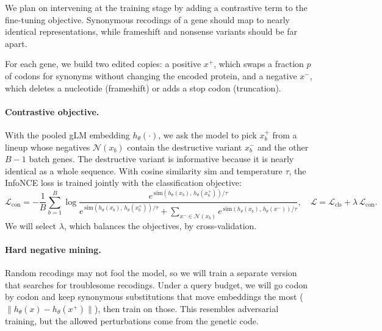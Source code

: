 \documentclass{article}
\begin{document}
We plan on intervening at the training stage by adding a contrastive
term to the fine-tuning objective. Synonymous recodings of a gene
should map to nearly identical representations, while frameshift
and nonsense variants should be far apart.


For each gene, we build two edited copies: a positive $x^+$, which
swaps a fraction $p$ of codons for synonyms without changing the
encoded protein, and a negative $x^-$, which deletes a nucleotide
(frameshift) or adds a stop codon (truncation).

\paragraph{Contrastive objective.}
With the pooled gLM embedding $h_\theta(\cdot)$, we ask the model to
pick $x_b^+$ from a lineup whose negatives $\mathcal{N}(x_b)$ contain
the destructive variant $x_b^-$ and the other $B-1$ batch genes.
The destructive variant is informative because it is nearly
identical as a whole sequence. With cosine similarity $\mathrm{sim}$ and
temperature $\tau$, the InfoNCE loss is trained jointly with the
classification objective:
\begin{equation}
  \mathcal{L}_{\mathrm{con}}
  = -\frac{1}{B}\sum_{b=1}^{B}
    \log \frac{e^{\,\mathrm{sim}(h_\theta(x_b),\,h_\theta(x_b^+))/\tau}}
    {e^{\,\mathrm{sim}(h_\theta(x_b),\,h_\theta(x_b^+))/\tau}
     + \sum_{x^- \in \mathcal{N}(x_b)}
       e^{\,\mathrm{sim}(h_\theta(x_b),\,h_\theta(x^-))/\tau}},
  \quad
  \mathcal{L}=\mathcal{L}_{\mathrm{cls}}
  +\lambda\,\mathcal{L}_{\mathrm{con}}.
  \label{eq:objective}
\end{equation}
We will select $\lambda$, which balances the objectives,
by cross-validation.

\paragraph{Hard negative mining.}
Random recodings may not fool the model, so we will train a separate
version that searches for troublesome recodings. Under a query budget,
we will go codon by codon and keep synonymous substitutions that move
embeddings the most
($\|h_\theta(x)-h_\theta(x^+)\|$), then train on those.
This resembles adversarial training, but the allowed perturbations
come from the genetic code.
\end{document}
